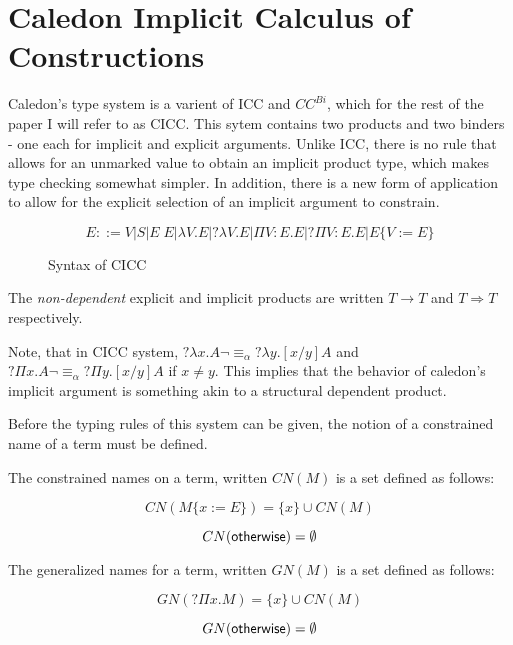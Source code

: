 \section{Caledon Implicit Calculus of Constructions}

Caledon's type system is a varient of ICC and $CC^{Bi}$, 
which for the rest of the paper I will refer to as CICC.  
This sytem contains two products and two binders - one each for implicit and explicit arguments. 
Unlike ICC, there is no rule that allows for an unmarked value to obtain an implicit product type, which
makes type checking somewhat simpler.  
In addition, there is a new form of application to allow for the explicit
selection of an implicit argument to constrain.

\begin{figure}[h]
\[ 
E ::= 
V 
| S 
| E\;E 
| \lambda V . E 
| ?\lambda V . E 
| \Pi V : E . E 
| ?\Pi V : E . E 
| E \{ V := E \}
\]

\caption{Syntax of CICC}
\label{cicc:syntax}
\end{figure}

The \textit{non-dependent} explicit and implicit products are written $T \rightarrow T$ 
and $T \Rightarrow T$ respectively.


Note, that in CICC system, $?\lambda x . A \neg\equiv_\alpha ?\lambda y . [x / y] A$ 
and $?\Pi x . A \neg\equiv_\alpha ?\Pi y . [x / y] A$  if $x \neq y$.  This implies that the 
behavior of caledon's implicit argument is something akin to a structural dependent product.  


Before the typing rules of this system can be given, the notion of a constrained name of a term must be defined.

\begin{definition}
The constrained names on a term, written $CN(M)$ is a set defined as follows:

\[ 
CN(M \{ x := E \}) = \{ x \} \cup CN(M)
\]

\[ 
CN(\mathsf{otherwise}) = \emptyset
\]

\end{definition}

\begin{definition}
The generalized names for a term, written $GN(M)$ is a set defined as follows:

\[ 
GN(?\Pi x . M) = \{ x \} \cup CN(M)
\]

\[ 
GN(\mathsf{otherwise}) = \emptyset
\]

\end{definition}

